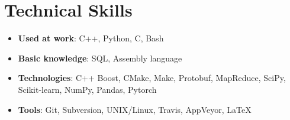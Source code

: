 \documentclass[letterpaper,11pt]{article}
\newcommand{\resumeItem}[2]{
  \item\small{
    \textbf{#1}{: #2 \vspace{-2pt}}
  }
}
\newcommand{\resumeSubItem}[2]{\resumeItem{#1}{#2}\vspace{-4pt}}
\newcommand{\resumeSubHeadingListStart}{\begin{itemize}[leftmargin=*]}
\newcommand{\resumeSubHeadingListEnd}{\end{itemize}}
\begin{document}
\section{Technical Skills}
  \resumeSubHeadingListStart
    \resumeSubItem{Used at work}{C++, Python, C, Bash}
    \resumeSubItem{Basic knowledge}{SQL, Assembly language}
    \resumeSubItem{Technologies}{C++ Boost, CMake, Make, Protobuf, MapReduce, SciPy, Scikit-learn, NumPy, Pandas, Pytorch}
    \resumeSubItem{Tools}{Git, Subversion, UNIX/Linux, Travis, AppVeyor, \LaTeX}
  \resumeSubHeadingListEnd



\end{document}
